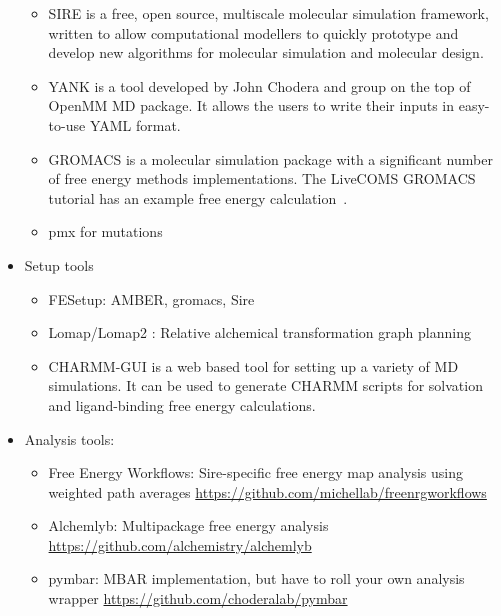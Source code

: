 \documentclass[9pt,bestpractices]{livecoms}
\begin{document}
\begin{itemize}
\begin{itemize}
	\item SIRE  is a free, open source, multiscale molecular simulation framework, written to allow computational modellers to quickly prototype and develop new algorithms for molecular simulation and molecular design. 
	\item YANK is a tool developed by John Chodera and group on the top of OpenMM MD package. It allows the users to write their inputs in easy-to-use YAML format.
	\item GROMACS is a molecular simulation package with a significant number of free energy methods implementations. The LiveCOMS GROMACS tutorial has an example free energy calculation~\cite{lemkul2018From}.
	\item pmx for mutations
	\end{itemize}
\item Setup tools
	\begin{itemize}
	\item FESetup: AMBER, gromacs, Sire
	\item Lomap/Lomap2 : Relative alchemical transformation graph planning
	\item CHARMM-GUI is a web based tool for setting up a variety of MD simulations. It can be used to generate CHARMM scripts for solvation and ligand-binding free energy calculations.
	\end{itemize}
\item Analysis tools:
	\begin{itemize}
	\item Free Energy Workflows: Sire-specific free energy map analysis using weighted path averages
	\url{https://github.com/michellab/freenrgworkflows}
	\item Alchemlyb: Multipackage free energy analysis
	\url{https://github.com/alchemistry/alchemlyb}
	\item pymbar: MBAR implementation, but have to roll your own analysis wrapper
	\url{https://github.com/choderalab/pymbar}
	\end{itemize}
\end{itemize}


\end{document}
